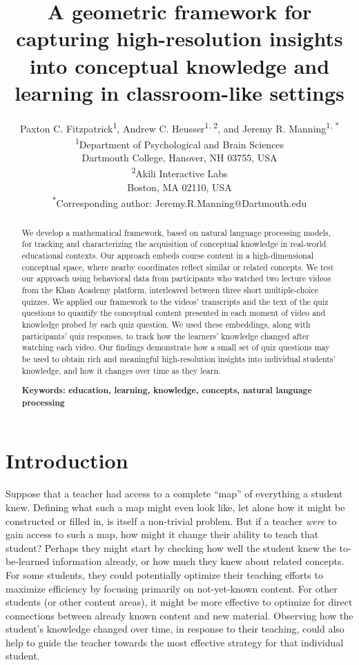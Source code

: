 \documentclass[10pt]{article}
\title{A geometric framework for capturing high-resolution insights into
conceptual knowledge and learning in classroom-like settings}
\author{Paxton C. Fitzpatrick\textsuperscript{1},
Andrew C. Heusser\textsuperscript{1, 2}, and Jeremy R.
Manning\textsuperscript{1, *}\\\small{\textsuperscript{1}Department of Psychological and Brain Sciences}\\\small{Dartmouth College, Hanover, NH 03755, USA}\\\small{\textsuperscript{2}Akili Interactive Labs}\\\small{Boston, MA 02110, USA}\\\small{\textsuperscript{*}Corresponding author:
Jeremy.R.Manning@Dartmouth.edu}}
\date{}
\begin{document}
\maketitle

\begin{abstract}\noindent We develop a mathematical framework, based on natural language
processing models, for tracking and characterizing the acquisition of
conceptual knowledge in real-world educational contexts. Our approach embeds
course content in a high-dimensional
conceptual space, where nearby coordinates reflect similar or related
concepts. We test our approach using behavioral data from participants who
watched two lecture videos from the Khan Academy platform, interleaved
between three short multiple-choice quizzes. We applied our
framework to the videos' transcripts and the text of the quiz questions to
quantify the conceptual content presented in each moment of video and knowledge probed by each quiz question. We used
these embeddings, along with participants' quiz responses, to track how the
learners' knowledge changed after watching each video. Our findings demonstrate how a
small set of quiz questions may be used to obtain rich and meaningful 
high-resolution insights into individual students' knowledge, and how it
changes over time as they learn.

\textbf{Keywords: education, learning, knowledge, concepts, natural language processing}

\end{abstract}


\section*{Introduction}

Suppose that a teacher had access to a complete ``map'' of everything a
student knew. Defining what such a map might even look like, let alone how it
might be constructed or filled in, is itself a non-trivial problem. But if a
teacher \textit{were} to gain access to such a map, how might it change their
ability to teach that student? Perhaps they might start by checking how well the
student knew the to-be-learned information already, or how much they knew about
related concepts. For some students, they could potentially optimize their
teaching efforts to maximize efficiency by focusing primarily on not-yet-known
content. For other students (or other content areas), it might be more
effective to optimize for direct connections between already known content and
new material. Observing how the student's knowledge changed over time,
in response to their teaching, could also help to guide the teacher towards
the most effective strategy for that individual student.
\end{document}
